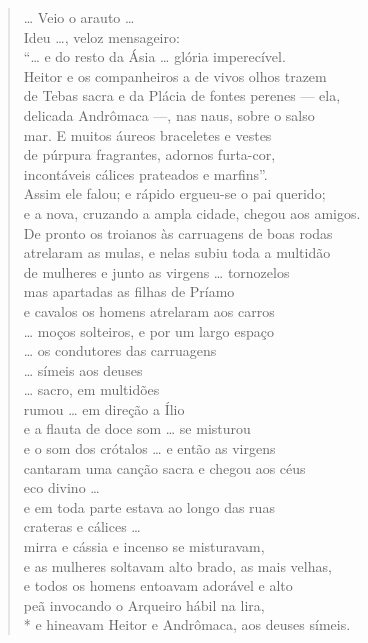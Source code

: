 \begin{verse}
\ldots{} Veio o arauto \ldots{}\\
Ideu \ldots{}, veloz mensageiro:\\
“\ldots{} e do resto da Ásia \ldots{} glória imperecível.\\
Heitor e os companheiros a de vivos olhos trazem\\
de Tebas sacra e da Plácia de fontes perenes --- ela,\\
delicada Andrômaca ---, nas naus, sobre o salso\\
mar. E muitos áureos braceletes e vestes\\
de púrpura fragrantes, adornos furta-cor,\\
incontáveis cálices prateados e marfins”.\\
Assim ele falou; e rápido ergueu-se o pai querido;\\
e a nova, cruzando a ampla cidade, chegou aos amigos.\\
De pronto os troianos às carruagens de boas rodas\\
atrelaram as mulas, e nelas subiu toda a multidão \\
de mulheres e junto as virgens \ldots{} tornozelos\\
mas apartadas as filhas de Príamo\\
e cavalos os homens atrelaram aos carros\\
\ldots{} moços solteiros, e por um largo espaço \\
\ldots{} os condutores das carruagens \\
\ldots{} símeis aos deuses\\
\ldots{} sacro, em multidões\\
rumou \ldots{} em direção a Ílio\\
e a flauta de doce som \ldots{} se misturou\\
e o som dos crótalos \ldots{} e então as virgens\\
cantaram uma canção sacra e chegou aos céus\\
eco divino \ldots{}\\
e em toda parte estava ao longo das ruas\\
crateras e cálices \ldots{}\\
mirra e cássia e incenso se misturavam,\\
e as mulheres soltavam alto brado, as mais velhas,\\
e todos os homens entoavam adorável e alto\\
peã invocando o Arqueiro hábil na lira,\\*
e hineavam Heitor e Andrômaca, aos deuses símeis.
\end{verse}

